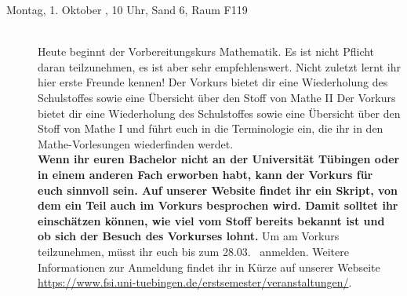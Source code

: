 \begin{description}

%
%

\item[Montag, 1. Oktober \YEAR, 10 Uhr, Sand 6, Raum F119]\ \\
Heute beginnt der Vorbereitungskurs Mathematik. Es ist nicht Pflicht daran teilzunehmen,
es ist aber sehr empfehlenswert. Nicht zuletzt lernt ihr hier erste Freunde kennen!
\ifsommersemester
Der Vorkurs bietet dir eine Wiederholung des Schulstoffes sowie eine Übersicht über den Stoff von Mathe II
\fi
\ifwintersemester
Der Vorkurs bietet dir eine Wiederholung des Schulstoffes sowie eine Übersicht über den Stoff von Mathe I
\fi
und führt euch in die Terminologie ein, die ihr in den Mathe-Vorlesungen wiederfinden werdet.
\ifmaster
\\
\textbf{Wenn ihr euren Bachelor nicht an der Universität Tübingen oder in einem anderen Fach erworben habt, kann der Vorkurs für euch sinnvoll sein. Auf unserer Website findet ihr ein Skript, von dem ein Teil auch im Vorkurs besprochen wird. Damit solltet ihr einschätzen können, wie viel vom Stoff bereits bekannt ist und ob sich der Besuch des Vorkurses lohnt.}
\fi
Um am Vorkurs teilzunehmen, müsst ihr euch bis zum 28.03. \YEAR~anmelden. Weitere Informationen zur Anmeldung findet ihr in Kürze auf unserer Webseite \url{https://www.fsi.uni-tuebingen.de/erstsemester/veranstaltungen/}.


\end{description}
